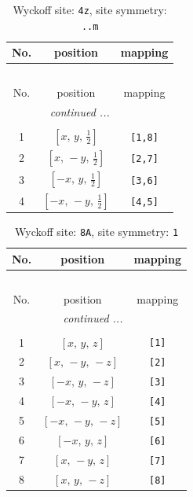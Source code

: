 \documentclass[fleqn,8pt]{jsarticle}
\begin{document}
\renewcommand{\arraystretch}{1.2}
\begin{longtable}{ccc}
\caption{Wyckoff site: {\tt 4z}, site symmetry: {\tt ..m}}
 \\
 \hline \hline
No. & position & mapping \\ \hline \endfirsthead

\multicolumn{2}{l}{\tablename\ \thetable{}} \\
 \hline \hline
No. & position & mapping \\ \hline \endhead

 \hline \hline
\multicolumn{2}{r}{\footnotesize\it continued ...} \\ \endfoot

 \hline \hline
\multicolumn{2}{r}{} \\ \endlastfoot

1 & $\left[ x,\, y,\, \frac{1}{2} \right]$ & {\tt [1,8]} \\ \hline
2 & $\left[ x,\, - y,\, \frac{1}{2} \right]$ & {\tt [2,7]} \\ \hline
3 & $\left[ - x,\, y,\, \frac{1}{2} \right]$ & {\tt [3,6]} \\ \hline
4 & $\left[ - x,\, - y,\, \frac{1}{2} \right]$ & {\tt [4,5]} \\
\end{longtable}
\renewcommand{\arraystretch}{1.2}
\begin{longtable}{ccc}
\caption{Wyckoff site: {\tt 8A}, site symmetry: {\tt 1}}
 \\
 \hline \hline
No. & position & mapping \\ \hline \endfirsthead

\multicolumn{2}{l}{\tablename\ \thetable{}} \\
 \hline \hline
No. & position & mapping \\ \hline \endhead

 \hline \hline
\multicolumn{2}{r}{\footnotesize\it continued ...} \\ \endfoot

 \hline \hline
\multicolumn{2}{r}{} \\ \endlastfoot

1 & $\left[ x,\, y,\, z \right]$ & {\tt [1]} \\ \hline
2 & $\left[ x,\, - y,\, - z \right]$ & {\tt [2]} \\ \hline
3 & $\left[ - x,\, y,\, - z \right]$ & {\tt [3]} \\ \hline
4 & $\left[ - x,\, - y,\, z \right]$ & {\tt [4]} \\ \hline
5 & $\left[ - x,\, - y,\, - z \right]$ & {\tt [5]} \\ \hline
6 & $\left[ - x,\, y,\, z \right]$ & {\tt [6]} \\ \hline
7 & $\left[ x,\, - y,\, z \right]$ & {\tt [7]} \\ \hline
8 & $\left[ x,\, y,\, - z \right]$ & {\tt [8]} \\
\end{longtable}
\end{document}
